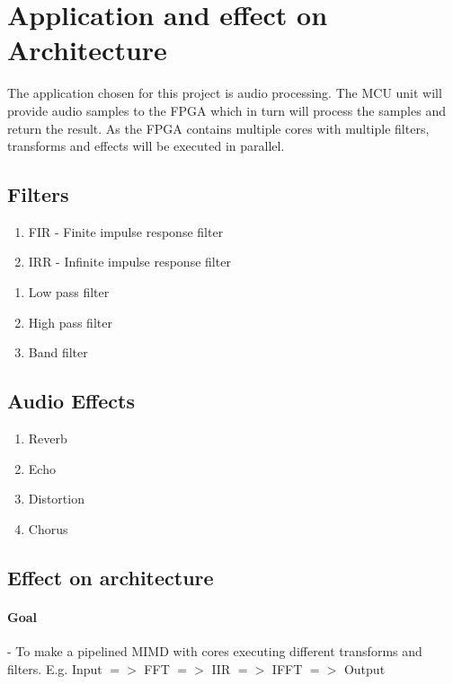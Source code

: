 \section{Application and effect on Architecture}


The application chosen for this project is audio processing. The MCU unit will
provide audio samples to the FPGA which in turn will process the samples and
return the result. As the FPGA contains multiple cores with multiple filters,
transforms and effects will be executed in parallel.

\subsection{Filters}

\begin{enumerate}
	\item FIR - Finite impulse response filter
	\item IRR - Infinite impulse response filter
\end{enumerate}

\begin{enumerate}
	\item Low pass filter
	\item High pass filter
	\item Band filter
\end{enumerate}

\subsection{Audio Effects}

\begin{enumerate}
	\item Reverb
	\item Echo
	\item Distortion
	\item Chorus
\end{enumerate}

\subsection{Effect on architecture}

\paragraph{Goal}
- To make a pipelined MIMD with cores executing different transforms and
filters.
	E.g. Input $=>$ FFT $=>$ IIR $=>$ IFFT $=>$ Output

